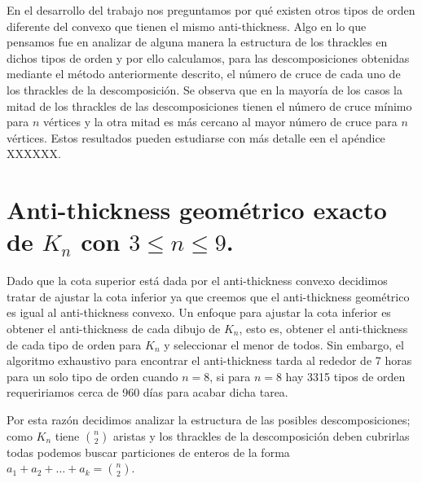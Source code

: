 En el desarrollo del trabajo nos preguntamos por qué existen
otros tipos de orden diferente del convexo que tienen el mismo anti-thickness.
Algo en lo que pensamos fue en analizar de alguna manera la estructura de los
thrackles en dichos tipos de orden y por ello calculamos, para las descomposiciones
obtenidas mediante el método anteriormente descrito, el número de cruce de cada
uno de los thrackles de la descomposición. Se observa que en la mayoría de los
casos la mitad de los thrackles de las descomposiciones
tienen el número de cruce mínimo para $n$ vértices y la otra mitad es más
cercano al mayor número de cruce para $n$ vértices. Estos resultados pueden
estudiarse con más detalle een el apéndice XXXXXX.

\section{Anti-thickness geométrico exacto de $K_n$ con $3\leq n \leq 9$.}
Dado que la cota superior está dada por el anti-thickness convexo decidimos tratar
de ajustar la cota inferior ya que creemos que el anti-thickness geométrico es igual
al anti-thickness convexo. Un enfoque para ajustar la cota inferior es obtener el
anti-thickness de cada dibujo de $K_n$, esto es, obtener el anti-thickness de cada
tipo de orden para $K_n$ y seleccionar el menor de todos. Sin embargo, el algoritmo
exhaustivo para encontrar el anti-thickness tarda al rededor de 7 horas para un solo
tipo de orden cuando $n=8$, si para $n=8$ hay 3315 tipos de orden requeririamos
cerca de 960 días para acabar dicha tarea.

Por esta razón decidimos analizar la estructura de las posibles descomposiciones;
como $K_n$ tiene $\binom{n}{2}$ aristas y los thrackles de la descomposición deben
cubrirlas todas podemos buscar particiones de enteros de la forma $a_1 + a_2 + \dots +
a_k = \binom{n}{2}$.

